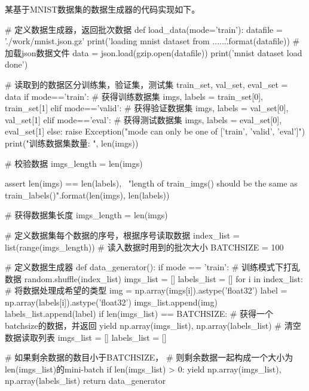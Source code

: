     某基于MNIST数据集的数据生成器的代码实现如下。
    \begin{python}
# 定义数据生成器，返回批次数据
def load_data(mode='train'):
    datafile = './work/mnist.json.gz'
    print('loading mnist dataset from {} ......'.format(datafile))
    # 加载json数据文件
    data = json.load(gzip.open(datafile))
    print('mnist dataset load done')
   
    # 读取到的数据区分训练集，验证集，测试集
    train_set, val_set, eval_set = data
    if mode=='train':
        # 获得训练数据集
        imgs, labels = train_set[0], train_set[1]
    elif mode=='valid':
        # 获得验证数据集
        imgs, labels = val_set[0], val_set[1]
    elif mode=='eval':
        # 获得测试数据集
        imgs, labels = eval_set[0], eval_set[1]
    else:
        raise Exception("mode can only be one of ['train', 'valid', 'eval']")
    print("训练数据集数量: ", len(imgs))
    
    # 校验数据
    imgs_length = len(imgs)

    assert len(imgs) == len(labels), \
          "length of train_imgs({}) should be the same as train_labels({})".format(len(imgs), len(labels))
    
    # 获得数据集长度
    imgs_length = len(imgs)
    
    # 定义数据集每个数据的序号，根据序号读取数据
    index_list = list(range(imgs_length))
    # 读入数据时用到的批次大小
    BATCHSIZE = 100
    
    # 定义数据生成器
    def data_generator():
        if mode == 'train':
            # 训练模式下打乱数据
            random.shuffle(index_list)
        imgs_list = []
        labels_list = []
        for i in index_list:
            # 将数据处理成希望的类型
            img = np.array(imgs[i]).astype('float32')
            label = np.array(labels[i]).astype('float32')
            imgs_list.append(img) 
            labels_list.append(label)
            if len(imgs_list) == BATCHSIZE:
                # 获得一个batchsize的数据，并返回
                yield np.array(imgs_list), np.array(labels_list)
                # 清空数据读取列表
                imgs_list = []
                labels_list = []
    
        # 如果剩余数据的数目小于BATCHSIZE，
        # 则剩余数据一起构成一个大小为len(imgs_list)的mini-batch
        if len(imgs_list) > 0:
            yield np.array(imgs_list), np.array(labels_list)
    return data_generator
    \end{python}

